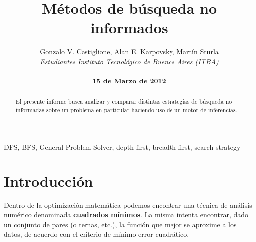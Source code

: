 \documentclass[%
	final,
	reprint,
	notitlepage,
	narroweqnarray,
	inline,
	twoside,
	invited
	]{ieee}
\begin{document}
\title[Métodos de búsqueda no informados]{%
       Métodos de búsqueda no informados}

\author[Castiglione, Karpovsky, Sturla]{Gonzalo V. Castiglione, Alan E. Karpovsky, Martín Sturla\\\textit{Estudiantes 
       Instituto Tecnológico de Buenos Aires (ITBA)}\\
\\\textbf{15 de Marzo de 2012}
}



\lognumber{}
\pubitemident{}


\maketitle               

\begin{abstract} 
El presente informe busca analizar y comparar distintas estrategias de búsqueda no informadas sobre un problema en particular haciendo uso de un motor de inferencias.
\end{abstract}

\begin{keywords}
DFS, BFS, General Problem Solver, depth-first, breadth-first, search strategy
\end{keywords}

\section{Introducción}

\PARstart Dentro de la optimización matemática podemos encontrar una técnica de análisis numérico denominada \textbf{cuadrados mínimos}. La misma intenta encontrar, dado un conjunto de pares (o ternas, etc.), la función que mejor se aproxime a los datos, de acuerdo con el criterio de mínimo error cuadrático.
\end{document}
